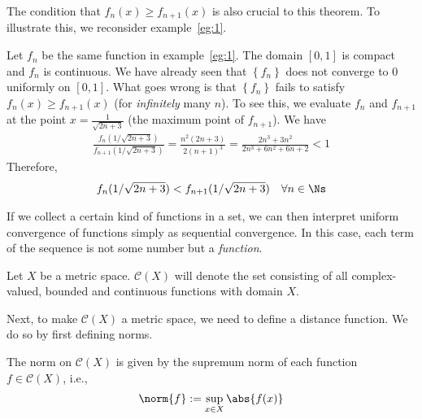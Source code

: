 \documentclass[thmcnt=section, 12pt]{elegantbook}
\begin{document}
\par The condition that $f_n(x) \geq f_{n+1}(x)$ is also crucial to this theorem. To illustrate this, we reconsider example~\ref{eg:1}.

\begin{example}
    Let $f_n$ be the same function in example~\ref{eg:1}. The domain $[0,1]$ is compact and $f_n$ is continuous. We have already seen that $\left\{f_n\right\}$ does not converge to $0$ uniformly on $[0,1]$. What goes wrong is that $\left\{f_n\right\}$ fails to satisfy $f_n(x) \geq f_{n+1}(x)$ (for \textit{infinitely} many $n$). To see this, we evaluate $f_n$ and $f_{n+1}$ at the point $x = \frac{1}{\sqrt{2n+3}}$ (the maximum point of $f_{n+1}$). We have 
    \begin{align*}
        \frac{f_{n}(1/\sqrt{2n+3})}{f_{n+1}(1/\sqrt{2n+3})}
        = \frac{n^2(2n+3)}{2(n+1)^3}
        = \frac{2n^3 + 3n^2}{2n^3 + 6n^2 + 6n + 2}
        < 1
    \end{align*}
    Therefore,
    \begin{align*}
        f_{n}(1/\sqrt{2n+3}) < f_{n+1}(1/\sqrt{2n+3}) 
        \quad \forall n \in \Ns
    \end{align*}
\end{example}


\par If we collect a certain kind of functions in a set, we can then interpret uniform convergence of functions simply as sequential convergence. In this case, each term of the sequence is not some number but a \textit{function}.

\begin{definition}
    Let $X$ be a metric space. $\mathscr{C}(X)$ will denote the set consisting of all complex-valued, bounded and continuous functions with domain $X$.
\end{definition}


\par Next, to make $\mathscr{C}(X)$ a metric space, we need to define a distance function. We do so by first defining norms.

\begin{definition} \label{def:5}
    The norm on $\mathscr{C}(X)$ is given by the supremum norm of each function $f \in \mathscr{C}(X)$, i.e.,  
    \begin{align*}
        \norm{f} := \sup_{x \in X}\abs{f(x)}
    \end{align*}
\end{definition}
\end{document}
